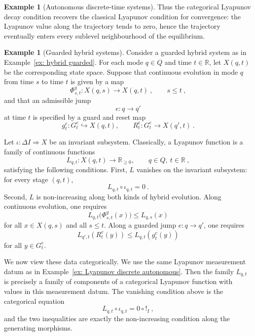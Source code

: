 \documentclass[a4paper,reqno,oneside]{amsart}
\theoremstyle{definition}
\newtheorem{example}[theorem]{Example}
\theoremstyle{remark}
\numberwithin{equation}{section}
\begin{document}
\begin{example}[Autonomous discrete-time systems]
Thus the categorical Lyapunov decay condition recovers the classical
Lyapunov condition for convergence: the Lyapunov value along the trajectory
tends to zero, hence the trajectory eventually enters every sublevel
neighbourhood of the equilibrium.
\end{example}

\begin{example}[Guarded hybrid systems]\label{ex: lyapunov guarded hybrid}
Consider a guarded hybrid system as in Example~\ref{ex: hybrid guarded}. For
each mode $q\in Q$ and time $t\in\mathbb R$, let $X(q,t)$ be the
corresponding state space. Suppose that continuous evolution in mode $q$ from
time $s$ to time $t$ is given by a map
\begin{equation}
    \Phi^q_{s,t}\colon X(q,s)\to X(q,t) \ ,
    \qquad s\leq t \ ,
\end{equation}
and that an admissible jump
\begin{equation}
    e\colon q\to q'
\end{equation}
at time $t$ is specified by a guard and reset map
\begin{equation}
    g^e_t\colon G^e_t\hookrightarrow X(q,t),
    \qquad
    R^e_t\colon G^e_t\to X(q',t) \ .
\end{equation}

Let $ \iota\colon \Delta I\Rightarrow X$ be an invariant subsystem. Classically, a Lyapunov function is a family of continuous functions
\begin{equation}
    L_{q,t}\colon X(q,t)\to\mathbb R_{\geq 0},
    \qquad q\in Q,\ t\in\mathbb R \ ,
\end{equation}
satisfying the following conditions. First, $L$ vanishes on the invariant subsystem: for every stage $(q,t)$,
\begin{equation}
    L_{q,t}\circ \iota_{q,t}
    = 0 \ .
\end{equation}
Second, $L$ is non-increasing along both kinds of hybrid evolution. Along
continuous evolution, one requires
\begin{equation}
    L_{q,t}\bigl(\Phi^q_{s,t}(x)\bigr)
    \leq
    L_{q,s}(x)
\end{equation}
for all $x\in X(q,s)$ and all $s\leq t$. Along a guarded jump
$e\colon q\to q'$, one requires
\begin{equation}
    L_{q',t}(R^e_t(y))
    \leq
    L_{q,t}(g^e_t(y))
\end{equation}
for all $y\in G^e_t$.

We now view these data categorically. We use the same Lyapunov measurement datum as in Example~\ref{ex: Lyapunov discrete autonomous}. Then the family $L_{q,t}$ is precisely a family of components of a categorical Lyapunov function with values in this measurement datum.
The vanishing condition above is the categorical equation
\begin{equation}
    L_{q,t}\circ \iota_{q,t}
    =
    0\circ {!}_I \ ,
\end{equation}
and the two inequalities are exactly the non-increasing condition along the
generating morphisms.


\end{example}
\end{document}
